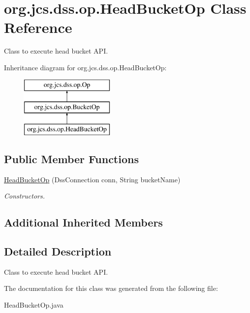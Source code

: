 \hypertarget{classorg_1_1jcs_1_1dss_1_1op_1_1HeadBucketOp}{}\section{org.\+jcs.\+dss.\+op.\+Head\+Bucket\+Op Class Reference}
\label{classorg_1_1jcs_1_1dss_1_1op_1_1HeadBucketOp}


Class to execute head bucket A\+PI.  


Inheritance diagram for org.\+jcs.\+dss.\+op.\+Head\+Bucket\+Op\+:\begin{figure}[H]
\begin{center}
\leavevmode
\includegraphics[height=3.000000cm]{classorg_1_1jcs_1_1dss_1_1op_1_1HeadBucketOp}
\end{center}
\end{figure}
\subsection*{Public Member Functions}
\begin{DoxyCompactItemize}
\item 
\hyperlink{classorg_1_1jcs_1_1dss_1_1op_1_1HeadBucketOp_aecd0d24ca7cba476670ec546582e2f99}{Head\+Bucket\+Op} (Dss\+Connection conn, String bucket\+Name)\hypertarget{classorg_1_1jcs_1_1dss_1_1op_1_1HeadBucketOp_aecd0d24ca7cba476670ec546582e2f99}{}\label{classorg_1_1jcs_1_1dss_1_1op_1_1HeadBucketOp_aecd0d24ca7cba476670ec546582e2f99}

\begin{DoxyCompactList}\small\item\em Constructors. \end{DoxyCompactList}\end{DoxyCompactItemize}
\subsection*{Additional Inherited Members}


\subsection{Detailed Description}
Class to execute head bucket A\+PI. 

The documentation for this class was generated from the following file\+:\begin{DoxyCompactItemize}
\item 
Head\+Bucket\+Op.\+java\end{DoxyCompactItemize}

